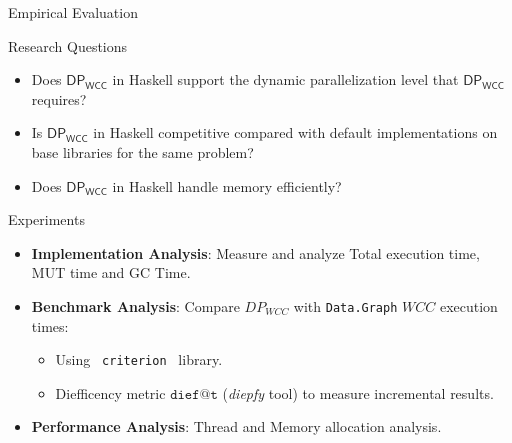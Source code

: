 \documentclass{beamer}
\newcommand{\dpwcc}{\mathsf{DP_{WCC}}}
\begin{document}
  \begin{frame}[fragile]{Empirical Evaluation}
    \begin{block}{Research Questions}
      \begin{itemize}
            \item Does $\dpwcc$ in Haskell support the dynamic parallelization level that $\dpwcc$ requires?
            \item Is $\dpwcc$ in Haskell competitive compared with default implementations on base libraries for the same problem?
            \item Does $\dpwcc$ in Haskell handle memory efficiently?
        \end{itemize}        
    \end{block}
    \begin{block}{Experiments}
      \begin{itemize}
        \item \textbf{Implementation Analysis}: Measure and analyze Total execution time, MUT time and GC Time.
        \item \textbf{Benchmark Analysis}: Compare $DP_{WCC}$ with \texttt{Data.Graph} $WCC$ execution times:
        \begin{itemize}
          \item Using \texttt{ criterion } library.
          \item Diefficency metric $\mathtt{dief@t}$ (\textit{diepfy} tool) to measure incremental results.
        \end{itemize}
        \item \textbf{Performance Analysis}: Thread and Memory allocation analysis.
      \end{itemize}
    \end{block}
  \end{frame}
\end{document}
